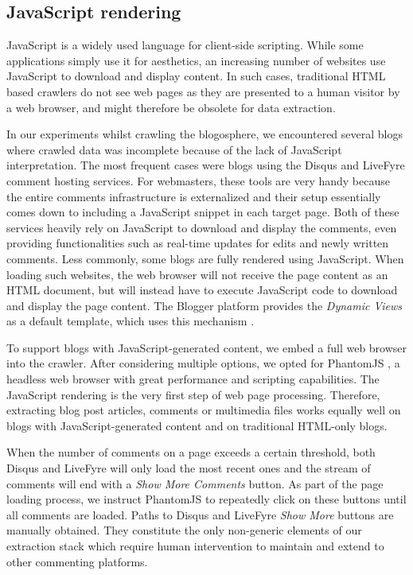 \subsection{JavaScript rendering}

JavaScript is a widely used language for client-side scripting. While some applications simply use it for aesthetics, an increasing number of websites use JavaScript to download and display content. In such cases, traditional HTML based crawlers do not see web pages as they are presented to a human visitor by a web browser, and might therefore be obsolete for data extraction.

In our experiments whilst crawling the blogosphere, we encountered several blogs where crawled data was incomplete because of the lack of JavaScript interpretation. The most frequent cases were blogs using the Disqus \cite{disqus2014} and LiveFyre \cite{livefyre2014} comment hosting services. For webmasters, these tools are very handy because the entire comments infrastructure is externalized and their setup essentially comes down to including a JavaScript snippet in each target page. Both of these services heavily rely on JavaScript to download and display the comments, even providing functionalities such as real-time updates for edits and newly written comments. Less commonly, some blogs are fully rendered using JavaScript. When loading such websites, the web browser will not receive the page content as an HTML document, but will instead have to execute JavaScript code to download and display the page content. The Blogger platform provides the \emph{Dynamic Views} as a default template, which uses this mechanism \cite{antinharasymiv2011}.

To support blogs with JavaScript-generated content, we embed a full web browser into the crawler. After considering multiple options, we opted for PhantomJS \cite{phantomjs2014}, a headless web browser with great performance and scripting capabilities. The JavaScript rendering is the very first step of web page processing. Therefore, extracting blog post articles, comments or multimedia files works equally well on blogs with JavaScript-generated content and on traditional HTML-only blogs.

When the number of comments on a page exceeds a certain threshold, both Disqus and LiveFyre will only load the most recent ones and the stream of comments will end with a \emph{Show More Comments} button. As part of the page loading process, we instruct PhantomJS to repeatedly click on these buttons until all comments are loaded. Paths to Disqus and LiveFyre \emph{Show More} buttons are manually obtained. They constitute the only non-generic elements of our extraction stack which require human intervention to maintain and extend to other commenting platforms.

